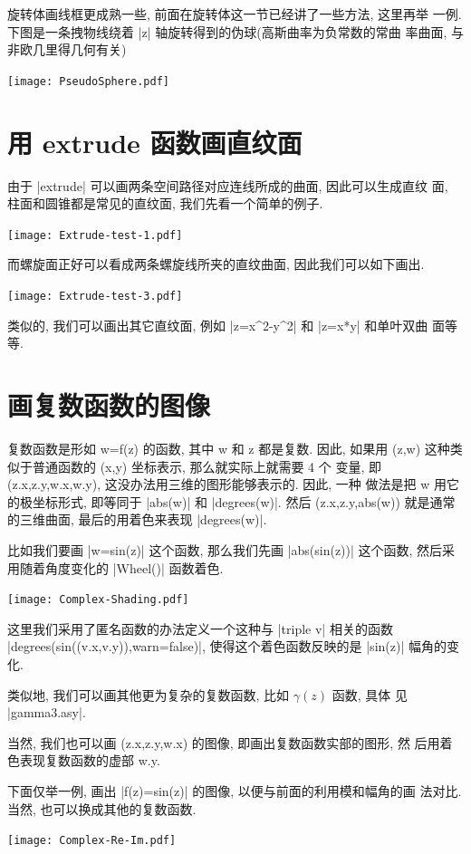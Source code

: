 \documentclass[nofonts,CJKnormalspaces]{ctexbook}[2009/05/20]
\begin{document}
旋转体画线框更成熟一些, 前面在旋转体这一节已经讲了一些方法, 这里再举
一例. 下图是一条拽物线绕着 |z| 轴旋转得到的伪球(高斯曲率为负常数的常曲
率曲面, 与非欧几里得几何有关)
\begin{center}\texttt{[image: PseudoSphere.pdf]}\end{center}%


\section{用 extrude 函数画直纹面}
由于 |extrude| 可以画两条空间路径对应连线所成的曲面, 因此可以生成直纹
面, 柱面和圆锥都是常见的直纹面, 我们先看一个简单的例子.
\begin{center}\texttt{[image: Extrude-test-1.pdf]}\end{center}%

而螺旋面正好可以看成两条螺旋线所夹的直纹曲面, 因此我们可以如下画出.
\begin{center}\texttt{[image: Extrude-test-3.pdf]}\end{center}%

类似的, 我们可以画出其它直纹面, 例如 |z=x^2-y^2| 和 |z=x*y| 和单叶双曲
面等等.

\section{画复数函数的图像}
复数函数是形如 w=f(z) 的函数, 其中 w 和 z 都是复数. 因此, 如果用
(z,w) 这种类似于普通函数的 (x,y) 坐标表示, 那么就实际上就需要 4 个
变量, 即 (z.x,z.y,w.x,w.y), 这没办法用三维的图形能够表示的. 因此, 一种
做法是把 w 用它的极坐标形式, 即等同于 |abs(w)| 和 |degrees(w)|. 然后
(z.x,z.y,abs(w)) 就是通常的三维曲面, 最后的用着色来表现 |degrees(w)|.

比如我们要画 |w=sin(z)| 这个函数, 那么我们先画 |abs(sin(z))| 这个函数,
然后采用随着角度变化的 |Wheel()| 函数着色.
\begin{center}\texttt{[image: Complex-Shading.pdf]}\end{center}%

这里我们采用了匿名函数的办法定义一个这种与 |triple v| 相关的函数
|degrees(sin((v.x,v.y)),warn=false)|, 使得这个着色函数反映的是
|sin(z)| 幅角的变化.

类似地, 我们可以画其他更为复杂的复数函数, 比如 $\gamma(z)$ 函数, 具体
见 |gamma3.asy|.

当然, 我们也可以画 (z.x,z.y,w.x) 的图像, 即画出复数函数实部的图形, 然
后用着色表现复数函数的虚部 w.y.

下面仅举一例, 画出 |f(z)=sin(z)| 的图像, 以便与前面的利用模和幅角的画
法对比. 当然, 也可以换成其他的复数函数.
\begin{center}\texttt{[image: Complex-Re-Im.pdf]}\end{center}%

\end{document}
